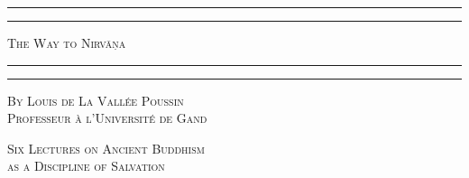 \documentclass[a4paper, 11pt, oneside, english, landscape]{article}
\begin{document}
\renewcommand{\thefigure}{{\bfseries\arabic{figure}}}
\renewcommand\thefootnote{\tiny{\arabic{footnote}}}
\let\oldfootnote\footnote
    \renewcommand{\footnote}[1]{\oldfootnote{\bfseries\footnotesize#1}}
    
\bfseries
\pagestyle{plain} %
\begin{titlepage} %
	\centering %


	\rule{\textwidth}{1.6pt}\vspace*{-\baselineskip}\vspace*{2pt} %
	\rule{\textwidth}{0.4pt} %
	
	\vspace{1\baselineskip} %
	
	{\scshape\Huge The Way to Nirvāṇa}
	
	\vspace{1\baselineskip} %

	\rule{\textwidth}{0.4pt}\vspace*{-\baselineskip}\vspace{3.2pt} %
	\rule{\textwidth}{1.6pt} %
	
	\vspace{1\baselineskip} %
	
	
        {\scshape\Large By Louis de La Vallée Poussin\\\small Professeur à l'Université de Gand}
 
        \vspace{1.0\baselineskip}
		
        {\scshape \scriptsize Six Lectures on Ancient Buddhism \\ as a Discipline of Salvation} %

        \vspace*{\fill}    


\end{titlepage}
\end{document}
